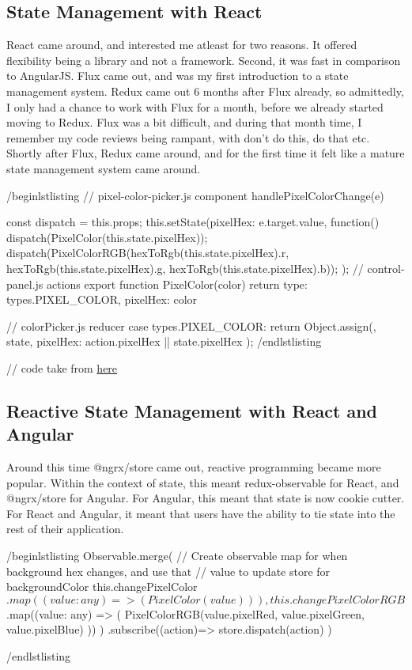 \subsection{ State Management with React }
React came around, and interested me atleast for two reasons. It offered
flexibility being a library and not a framework. Second, it was fast in
comparison to AngularJS. Flux came out, and was my first introduction to a
state management system. Redux came out 6 months after Flux already, so
admittedly, I only had a chance to work with Flux for a month, before we already
started moving to Redux. Flux was a bit difficult, and during that month time,
I remember my code reviews being rampant, with don't do this, do that etc.
Shortly after Flux, Redux came around, and for the first time it felt like a
mature state management system came around.

/begin{lstlisting}
// pixel-color-picker.js component
handlePixelColorChange(e){
    const {dispatch} = this.props;
    this.setState({pixelHex: e.target.value}, function(){
        dispatch(PixelColor(this.state.pixelHex));
        dispatch(PixelColorRGB(hexToRgb(this.state.pixelHex).r, hexToRgb(this.state.pixelHex).g, hexToRgb(this.state.pixelHex).b));
    });
// control-panel.js actions
export function PixelColor(color){
  return{
    type: types.PIXEL\_COLOR,
    pixelHex: color
  }
}

// colorPicker.js reducer
case types.PIXEL\_COLOR:
  return Object.assign({}, state, {
    pixelHex: action.pixelHex || state.pixelHex
  });
/end{lstlisting}

// code take from \href{https://github.com/CharlieGreenman/pixelLight}{here}

\subsection{ Reactive State Management with React and Angular }
Around this time @ngrx/store came out, reactive programming became more popular.
Within the context of state, this meant redux-observable for React, and
@ngrx/store for Angular. For Angular, this meant that state is now cookie
cutter. For React and Angular, it meant that users have the ability to tie state into the
rest of their application.

/begin{lstlisting}
Observable.merge(
  // Create observable map for  when background hex changes, and use that
  // value to update store for backgroundColor
  this.changePixelColor$.map((value: any) => (
    PixelColor(value)
  )),
  this.changePixelColorRGB$.map((value: any) => (
    PixelColorRGB(value.pixelRed, value.pixelGreen,
      value.pixelBlue)
  ))
)
.subscribe((action)=>{
  store.dispatch(action)
})
}
/end{lstlisting}

